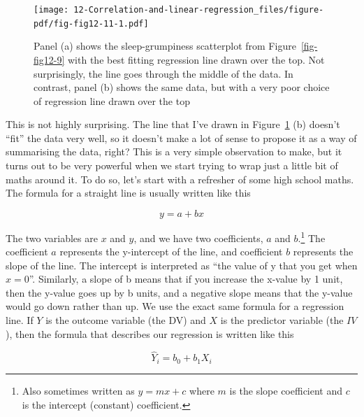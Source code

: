 \documentclass[
  a4paper,
]{book}
\begin{document}
\begin{figure}

\texttt{[image: 12-Correlation-and-linear-regression\_files/figure-pdf/fig-fig12-11-1.pdf]} \hfill{}

\caption{\label{fig-fig12-11}Panel (a) shows the sleep-grumpiness
scatterplot from Figure~\ref{fig-fig12-9} with the best fitting
regression line drawn over the top. Not surprisingly, the line goes
through the middle of the data. In contrast, panel (b) shows the same
data, but with a very poor choice of regression line drawn over the top}

\end{figure}

This is not highly surprising. The line that I've drawn in
Figure~\ref{fig-fig12-11} (b) doesn't ``fit'' the data very well, so it
doesn't make a lot of sense to propose it as a way of summarising the
data, right? This is a very simple observation to make, but it turns out
to be very powerful when we start trying to wrap just a little bit of
maths around it. To do so, let's start with a refresher of some high
school maths. The formula for a straight line is usually written like
this

\[y=a+bx\]

The two variables are \(x\) and \(y\), and we have two coefficients,
\(a\) and \(b\).\footnote{Also sometimes written as \(y = mx + c\) where
  \(m\) is the slope coefficient and \(c\) is the intercept (constant)
  coefficient.} The coefficient \(a\) represents the y-intercept of the
line, and coefficient \(b\) represents the slope of the line. The
intercept is interpreted as ``the value of y that you get when
\(x = 0\)''. Similarly, a slope of b means that if you increase the
x-value by 1 unit, then the y-value goes up by b units, and a negative
slope means that the y-value would go down rather than up. We use the
exact same formula for a regression line. If \(Y\) is the outcome
variable (the DV) and \(X\) is the predictor variable (the \(IV\)), then
the formula that describes our regression is written like this

\[\hat{Y}_i=b_0+b_1X_i\]
\end{document}
